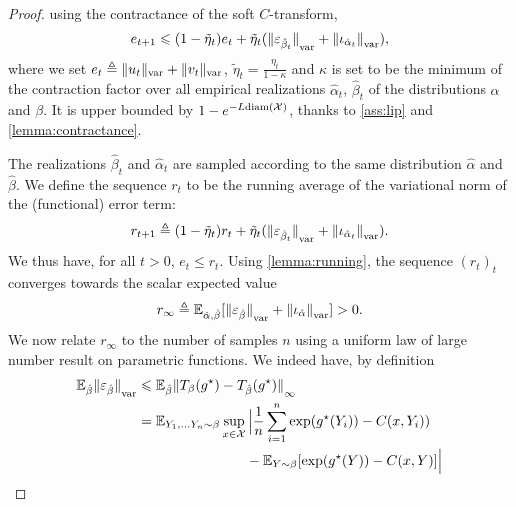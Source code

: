 \begin{proof}
using the contractance of the soft $C$-transform,
\begin{equation}
    \label{eq:ineq_var}
    e_{t+1} \leqslant 
    (1 - \tilde \eta_t) e_t
    + \tilde \eta_t
    ({\Vert \varepsilon_{\hat \beta_t} \Vert}_{\text{\upshape var}} + 
    {\Vert \iota_{\hat \alpha_t} \Vert}_{\text{\upshape var}}),
\end{equation}
where we set $e_t \triangleq \Vert u_t \Vert_{\text{\upshape var}} + \Vert v_t \Vert_{\text{\upshape var}}$,
$\tilde \eta_t = \frac{\eta_t}{1-\kappa}$ and $\kappa$ is set to be the minimum
of the contraction factor over all empirical realizations $\hat \alpha_t$, $\hat
\beta_t$ of the distributions $\alpha$ and $\beta$. It is upper bounded by
$1 - e^{- L\text{diam}(\mathcal{X})}$, thanks to \autoref{ass:lip} and \autoref{lemma:contractance}.

The realizations $\hat \beta_t$ and $\hat \alpha_t$
are sampled according to the same distribution $\hat \alpha$ and $\hat \beta$. We
define the sequence $r_t$ to be the running average of the variational norm of the
(functional) error term:
\begin{equation}
    r_{t+1} \triangleq (1 - \tilde \eta_t) r_t + \tilde \eta_t 
    ({\Vert \varepsilon_{\hat \beta_t} \Vert}_{\text{\upshape var}} + 
    {\Vert \iota_{\hat \alpha_t} \Vert}_{\text{\upshape var}}).
\end{equation}
We thus have, for all $t > 0$, $e_t \leq r_t$. Using \autoref{lemma:running}, the sequence $(r_t)_t$
converges towards the scalar expected value
\begin{equation}\label{eq:r_infty}
    r_\infty \triangleq \mathbb{E}_{\hat \alpha, \hat \beta}[{\Vert \varepsilon_{\hat \beta} \Vert}_{\text{\upshape var}}
    + {\Vert \iota_{\hat \alpha} \Vert}_{\text{\upshape var}}] > 0.
\end{equation}
We now relate $r_\infty$ to the number of samples $n$ using
a uniform law of large number result on parametric functions. We indeed have, by definition
\begin{align}
    \EE_{\hat \beta} {\Vert \epsilon_{\hat \beta} \Vert}_{\var} 
    &\leq
    \EE_{\hat \beta} {\Vert \Ctrans{g^\star}{\beta} 
    - \Ctrans{g^\star}{\hat \beta} \Vert}_{\infty} \\
    &= \EE_{Y_1, \dots Y_n \sim \beta} 
    \sup_{x \in \Xx}
     \Big| \frac{1}{n} \sum_{i=1}^n \exp(g^\star(Y_i)) - C(x, Y_i)) \\
      &\phantom{=}\qquad\qquad\qquad\quad- \EE_{Y \sim \beta}[\exp(g^\star(Y)) - C(x, Y)] \Big| \\

\end{align}
\end{proof}
